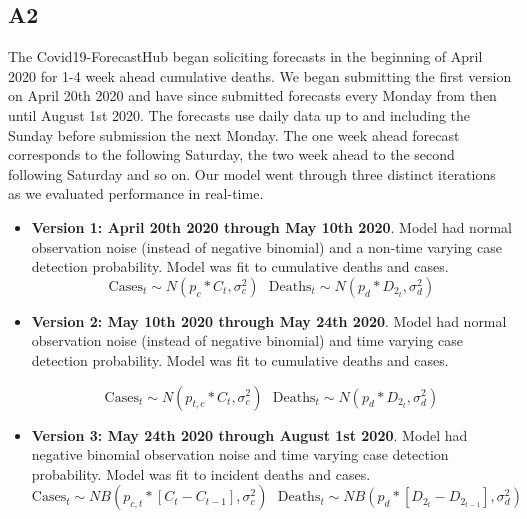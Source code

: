 \documentclass[11pt]{amsart}
\begin{document}
\subsection{A2}

 
The Covid19-ForecastHub began soliciting forecasts in the beginning of April 2020 for 1-4 week ahead cumulative deaths. We began submitting the first version on April 20th 2020 and have since submitted forecasts every Monday from then until August 1st 2020. The forecasts use daily data up to and including the Sunday before submission the next Monday. The one week ahead forecast corresponds to the following Saturday, the two week ahead to the second following Saturday and so on. Our model went through three distinct iterations as we evaluated performance in real-time. 
 
 \begin{itemize}
 
 \item \textbf{Version 1: April 20th 2020 through May 10th 2020}. Model had normal observation noise (instead of negative binomial) and a non-time varying case detection probability. Model was fit to cumulative deaths and cases. 
 \begin{equation}
\text{Cases}_{t} \sim N(p_{c}*C_{t} ,\sigma_{c}^2) \ \ \  
\text{Deaths}_{t} \sim N(p_d*D_{2_{t}} , \sigma_d^2)
\end{equation}

  \item \textbf{Version 2: May 10th 2020 through May 24th 2020}. Model had normal observation noise (instead of negative binomial) and time varying case detection probability. Model was fit to cumulative deaths and cases. 
  
   \begin{equation}
\text{Cases}_{t} \sim N(p_{t,c}*C_{t} ,\sigma_{c}^2) \ \ \  
\text{Deaths}_{t} \sim N(p_d*D_{2_{t}} , \sigma_d^2)
\end{equation}


    \item \textbf{Version 3: May 24th 2020 through August 1st 2020}. Model had negative binomial observation noise  and time varying case detection probability. Model was fit to incident deaths and cases. 
     \begin{equation}
\text{Cases}_{t} \sim NB(p_{c,t}*[C_{t}-C_{t-1}] ,\sigma_{c}^2) \ \ \  
\text{Deaths}_{t} \sim NB(p_d*[D_{2_{t}} - D_{2_{t-1}}] , \sigma_d^2)
\end{equation}
    
 \end{itemize} 
 
\end{document}
